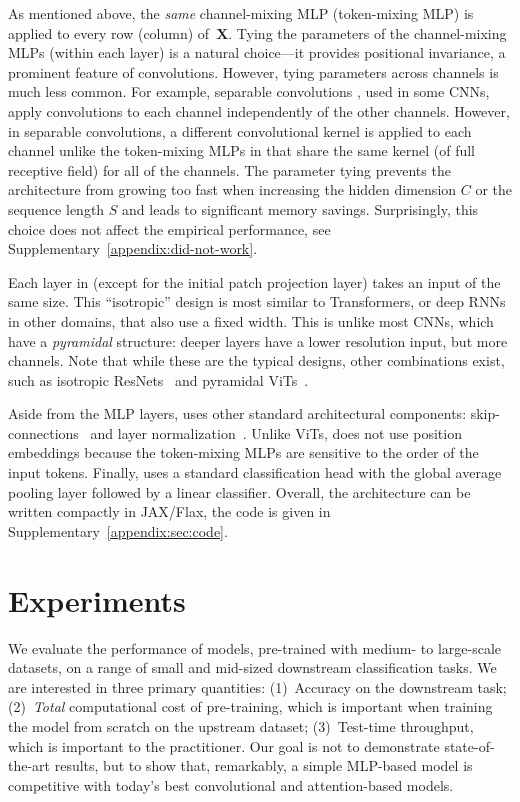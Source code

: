 As mentioned above, the \emph{same} channel-mixing MLP (token-mixing MLP) is applied to every row (column) of~$\mathbf{X}$.
Tying the parameters of the channel-mixing MLPs (within each layer) is a natural choice---it provides positional invariance, a prominent feature of convolutions.
However, tying  parameters across channels is much less common.
For example, separable convolutions \cite{chollet2017xception,Sifre2014phd}, used in some CNNs, apply convolutions to each channel independently of the other channels.
However, in separable convolutions, a different convolutional
kernel is applied to each channel unlike the token-mixing MLPs in \name{} that share the same kernel (of full receptive field) for all of the channels.
The parameter tying prevents the architecture from growing too fast when increasing the hidden dimension $C$ or the sequence length $S$ and leads to significant memory savings.
Surprisingly, this choice does not affect the empirical performance, see Supplementary~\ref{appendix:did-not-work}.

Each layer in \name{} (except for the initial patch projection layer) takes an input of the same size.
This ``isotropic'' design is most similar to Transformers, or deep RNNs in other domains, that also use a fixed width.
This is unlike most CNNs, which have a \emph{pyramidal} structure: deeper layers have a lower resolution input, but more channels.
Note that while these are the typical designs, other combinations exist, such as isotropic ResNets~\citep{Sandler2019} and pyramidal ViTs~\citep{wang2021pyramid}.

Aside from the MLP layers, \name{} uses other standard architectural components: skip-con\-nec\-tions~\cite{he2016deep} and layer normalization~\cite{ba2016layer}.
Unlike ViTs, \name{} does not use position embeddings because the token-mixing MLPs are sensitive to the order of the input tokens.
Finally, \name{} uses a standard classification head with the global average pooling layer followed by a linear classifier. 
Overall, the architecture can be written compactly in JAX/Flax, the code is given in Supplementary~\ref{appendix:sec:code}.


\section{Experiments}
\label{sec:experiments}
We evaluate the performance of \fullname{} models, pre-trained with medium- to large-scale datasets,
on a range of small and mid-sized downstream classification tasks.
We are interested in three primary quantities:
(1)~Accuracy on the downstream task;
(2)~\emph{Total} computational cost of pre-training, which is important when training the model from scratch on the upstream dataset;
(3)~Test-time throughput, which is important to the practitioner.
Our goal is not to demonstrate state-of-the-art results, but to show that, remarkably, a simple MLP-based model is competitive with today's best convolutional and attention-based models.

